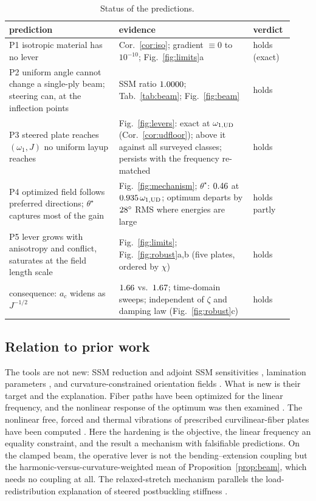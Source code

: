 \begin{table}[!tbp]
\centering\footnotesize
\caption{Status of the predictions.}\label{tab:verdict}
\begin{tabular}{@{}p{0.36\linewidth}p{0.44\linewidth}p{0.13\linewidth}@{}}
\toprule
prediction & evidence & verdict\\ \midrule
P1 isotropic material has no lever & Cor.~\ref{cor:iso}; gradient $\equiv0$ to $10^{-10}$; Fig.~\ref{fig:limits}a & holds (exact)\\
P2 uniform angle cannot change a single-ply beam; steering can, at the inflection points & SSM ratio $1.0000$; Tab.~\ref{tab:beam}; Fig.~\ref{fig:beam} & holds\\
P3 steered plate reaches $(\omega_1,J)$ no uniform layup reaches & Fig.~\ref{fig:levers}: exact at $\omega_{1,\mathrm{UD}}$ (Cor.~\ref{cor:udfloor}); above it against all surveyed classes; persists with the frequency re-matched & holds\\
P4 optimized field follows preferred directions; $\theta^\star$ captures most of the gain & Fig.~\ref{fig:mechanism}; $\theta^\star$: $0.46$ at $0.935\,\omega_{1,\mathrm{UD}}$; optimum departs by $28^\circ$ RMS where energies are large & holds partly\\
P5 lever grows with anisotropy and conflict, saturates at the field length scale & Fig.~\ref{fig:limits}; Fig.~\ref{fig:robust}a,b (five plates, ordered by $\chi$) & holds\\
consequence: $a_c$ widens as $J^{-1/2}$ & $1.66$ vs.\ $1.67$; time-domain sweeps; independent of $\zeta$ and damping law (Fig.~\ref{fig:robust}c) & holds\\
\bottomrule
\end{tabular}
\end{table}

\subsection{Relation to prior work}
The tools are not new: SSM reduction and adjoint SSM sensitivities
\cite{haller2016,jain2022,li2024,pozzi2025,liang2025}, lamination parameters \cite{tsai1968}, and
curvature-constrained orientation fields \cite{wong2026}. What is new is their target and the
explanation. Fiber paths have been optimized for the linear frequency, and the nonlinear response of
the optimum was then examined \cite{farsadi2021,farsadi2025}. The nonlinear free, forced and thermal
vibrations of prescribed curvilinear-fiber plates have been computed
\cite{ribeiro2012,akhavan2015,akhavan2017,houmat2013,yan2021,zhao2026}. Here the hardening is the
objective, the linear frequency an equality constraint, and the result a mechanism with falsifiable
predictions. On the clamped beam, the operative lever is not the bending--extension coupling but the
harmonic-versus-curvature-weighted mean of Proposition~\ref{prop:beam}, which needs no coupling at
all. The relaxed-stretch mechanism parallels the load-redistribution explanation of steered
postbuckling stiffness \cite{gurdal,wu2013}.

